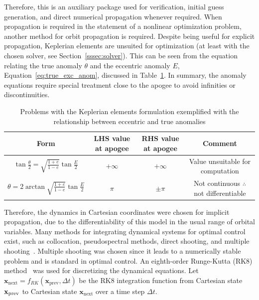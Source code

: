 Therefore, this is an auxiliary package used for verification, initial guess generation, and direct numerical propagation whenever required. When propagation is required in the statement of a nonlinear optimization problem, another method for orbit propagation is required. Despite being useful for explicit propagation, Keplerian elements are unsuited for optimization (at least with the chosen solver, see Section~\ref{sssec:solver}). This can be seen from the equation relating the true anomaly \(\theta\) and the eccentric anomaly \(E\), Equation~\eqref{eq:true_exc_anom}, discussed in Table~\ref{tab:kep_ecc_true}. In summary, the anomaly equations require special treatment close to the apogee to avoid infinities or discontinuities.

\begin{table}[htbp]
    \centering
    \begin{tabular}{cccc} \toprule
        Form & LHS value at apogee & RHS value at apogee & Comment  \\ \midrule
        \(\tan{\frac{\theta}{2}} = \sqrt{\frac{1+e}{1-e}} \tan{\frac{E}{2}}\) & \(+\infty\) & \(+\infty\) & \parbox{2.5cm}{Value unsuitable for computation} \\
        \(\theta = 2\arctan{\sqrt{\frac{1+e}{1-e}} \tan{\frac{E}{2}}}\) & \(\pi\) & \(\pm\pi\) & \parbox{2.5cm}{Not continuous \(\therefore\) not differentiable} \\ \bottomrule
    \end{tabular}
    \caption{Problems with the Keplerian elements formulation exemplified with the relationship between eccentric and true anomalies}
    \label{tab:kep_ecc_true}
\end{table}

Therefore, the dynamics in Cartesian coordinates were chosen for implicit propagation, due to the differentiability of this model in the usual range of orbital variables. Many methods for integrating dynamical systems for optimal control exist, such as collocation, pseudospectral methods, direct shooting, and multiple shooting~\cite{numerical_recipes}. Multiple shooting was chosen since it leads to a numerically stable problem and is standard in optimal control. An eighth-order Runge-Kutta (RK8) method~\cite{rk8} was used for discretizing the dynamical equations. Let  \(\mathbf{x}_{\text{next}} = f_{RK}(\mathbf{x}_{\text{prev}}, \Delta t)\) be the RK8 integration function from Cartesian state \(\mathbf{x}_{\text{prev}}\) to Cartesian state \(\mathbf{x}_{\text{next}}\) over a time step \(\Delta t\).

